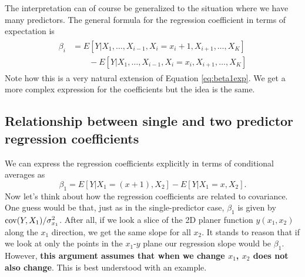 The interpretation can of course be generalized to the situation where we have many predictors. The general formula for the regression coefficient in terms of expectation is 
\begin{align*}
\begin{split}
\beta_i &= E[Y|X_1,\dots,X_{i-1},X_i=x_i+1,X_{i+1},\dots,X_K]\\
&\quad\quad - E[Y|X_1,\dots,X_{i-1},X_i=x_i,X_{i+1},\dots,X_K]
\end{split}
\end{align*}
Note how this is a very natural extension of Equation \ref{eq:beta1exp}. 
We get a more complex expression for the coefficients but the idea is the same. 


\subsection{Relationship between single and two predictor regression coefficients}

 We can express the regression coefficients explicitly in terms of conditional averages as
 \begin{equation}\label{eq:beta1exp}
 \beta_1 = E[Y|X_1 = (x+1),X_2] -  E[Y|X_1 = x,X_2].
 \end{equation}
Now let's think about how the regression coefficients are related to covariance. One guess would be that, just as in the single-predictor case, $\beta_1$ is given by ${\rm cov}(Y,X_1)/\sigma_{x_1}^2$. After all, if we look a slice of the 2D planer function $y(x_1,x_2)$ along the $x_1$ direction, we get the same slope for all $x_2$.  It stands to reason that if we look at only the points in the $x_1$-$y$ plane our regression slope would be $\beta_1$. However, {\bf this argument assumes that when we change $x_1$, $x_2$ does not also change}. This is best understood with an example. 


